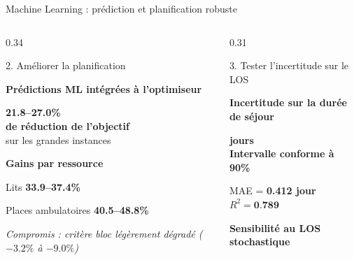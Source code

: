 \documentclass[aspectratio=169,11pt]{beamer}
\begin{document}
\begin{frame}{Machine Learning : prédiction et planification robuste}
\begin{columns}[T,onlytextwidth]
\begin{column}{0.34\textwidth}
\begin{block}{2. Améliorer la planification}
\scriptsize

\textbf{Prédictions ML intégrées à l'optimiseur}

\vspace{0.18cm}

{\Large\color{mcmPrimary}\textbf{21.8--27.0\%}}\\
\textbf{de réduction de l'objectif}\\
sur les grandes instances

\vspace{0.25cm}

\textbf{Gains par ressource}

\vspace{0.12cm}

Lits
\hfill
{\color{mcmPrimary}\textbf{33.9--37.4\%}}

\vspace{0.10cm}

Places ambulatoires
\hfill
{\color{mcmPrimary}\textbf{40.5--48.8\%}}

\vspace{0.30cm}

\textit{Compromis : critère bloc légèrement dégradé
($-3.2\%$ à $-9.0\%$)}

\end{block}

\end{column}


\begin{column}{0.31\textwidth}

\begin{block}{3. Tester l'incertitude sur le LOS}
\scriptsize

\textbf{Incertitude sur la durée de séjour}

\vspace{0.18cm}

{\Large\color{mcmPrimary}\textbf{ jours}}\\
\textbf{Intervalle conforme à 90\%}

\vspace{0.12cm}

MAE = \textbf{0.412 jour}
\qquad
$R^2 = \textbf{0.789}$

\vspace{0.30cm}

\textbf{Sensibilité au LOS stochastique}


\end{block}
\end{column}
\end{columns}
\end{frame}
\end{document}
